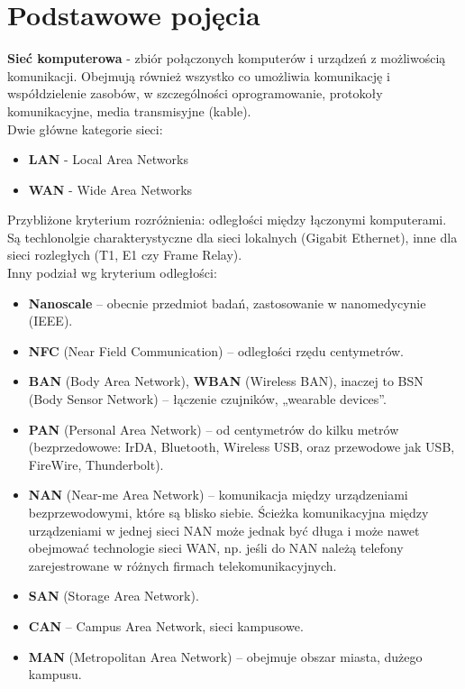 \documentclass[a4paper]{article}
\begin{document}
\section{Podstawowe pojęcia}
\textbf{Sieć komputerowa} - zbiór połączonych komputerów i urządzeń z możliwością komunikacji. Obejmują	również	wszystko co	umożliwia
komunikację i współdzielenie zasobów, w szczególności oprogramowanie, protokoły komunikacyjne, media transmisyjne (kable).
\\
Dwie główne kategorie sieci:
\begin{itemize}
    \item \textbf{LAN} - Local Area Networks
    \item \textbf{WAN} - Wide Area Networks
\end{itemize}

Przybliżone  kryterium	 rozróżnienia: odległości między łączonymi	komputerami. Są techlonolgie charakterystyczne dla
sieci	lokalnych (Gigabit Ethernet),	inne dla sieci rozległych (T1,	E1	czy	Frame	Relay).
\\
Inny podział wg kryterium odległości:
\begin{itemize}
    \item \textbf{Nanoscale} – obecnie przedmiot badań, zastosowanie w nanomedycynie (IEEE).
    \item \textbf{NFC} (Near Field Communication) – odległości	rzędu	centymetrów.
    \item \textbf{BAN} (Body Area Network),	\textbf{WBAN} (Wireless	BAN),	inaczej to	BSN	(Body	Sensor	Network) – łączenie	czujników,	„wearable	devices”.
    \item \textbf{PAN} (Personal Area Network) – od centymetrów	do	kilku metrów (bezprzedowowe: IrDA,	Bluetooth,	Wireless USB,	oraz	przewodowe	jak	USB,	FireWire,
Thunderbolt).
    \item \textbf{NAN} (Near-me	Area	Network)	– komunikacja	między	urządzeniami bezprzewodowymi, które	są	blisko	siebie. Ścieżka	komunikacyjna	między	urządzeniami	w	jednej	sieci	NAN	może jednak	być	długa	i	może	nawet	obejmować	technologie	sieci	WAN,	np.	jeśli	do	NAN	należą telefony	zarejestrowane	w	różnych	firmach	telekomunikacyjnych.
    \item \textbf{SAN} (Storage	Area	Network).
    \item \textbf{CAN} – Campus	Area	Network,	sieci	kampusowe.
    \item \textbf{MAN} (Metropolitan	Area	Network)	– obejmuje	obszar	miasta,	dużego	kampusu.
\end{itemize}
\end{document}
